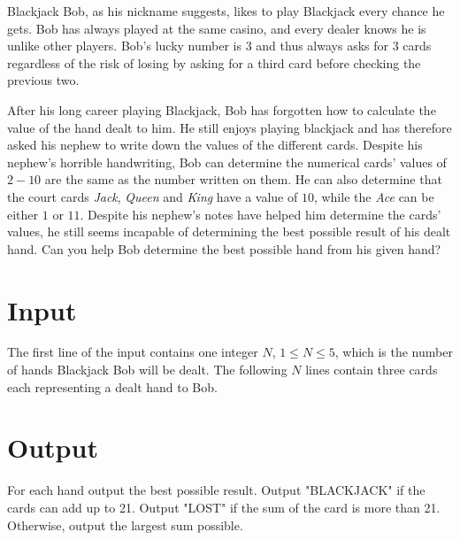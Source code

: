 Blackjack Bob, as his nickname suggests, likes to play Blackjack every chance he gets.
Bob has always played at the same casino, and every dealer knows he is unlike other players.
Bob's lucky number is $3$ and thus always asks for $3$ cards regardless of the risk of losing by asking for a third card before checking the previous two.

After his long career playing Blackjack, Bob has forgotten how to calculate the value of the hand dealt to him.
He still enjoys playing blackjack and has therefore asked his nephew to write down the values of the different cards.
Despite his nephew's horrible handwriting, Bob can determine the numerical cards' values of $2-10$ are the same as the number written on them.
He can also determine that the court cards \textit{Jack}, \textit{Queen} and \textit{King} have a value of $10$, while the \textit{Ace} can be either $1$ or $11$.
Despite his nephew's notes have helped him determine the cards' values, he still seems incapable of determining the best possible result of his dealt hand.
Can you help Bob determine the best possible hand from his given hand?
\section*{Input}

The first line of the input contains one integer $N$, $1 \leq N \leq 5$, which is the number of hands Blackjack Bob will be dealt.
The following $N$ lines contain three cards each representing a dealt hand to Bob.


\section*{Output}

For each hand output the best possible result.
Output "BLACKJACK" if the cards can add up to 21.
Output "LOST" if the sum of the card is more than 21.
Otherwise, output the largest sum possible.

